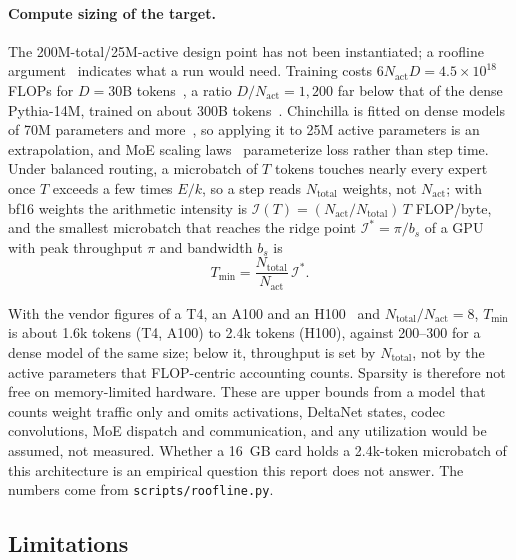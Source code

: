 \documentclass[11pt]{article}
\begin{document}
\paragraph{Compute sizing of the target.}
\label{sec:sizing}
The 200M-total/25M-active design point has not been instantiated; a roofline
argument~\citep{williams2009roofline} indicates what a run would need. Training costs
$6N_{\text{act}}D=4.5\times10^{18}$ FLOPs for $D=30$B tokens~\citep{kaplan2020scaling}, a ratio
$D/N_{\text{act}}=1{,}200$ far below that of the dense Pythia-14M, trained on about 300B
tokens~\citep{biderman2023pythia}. Chinchilla is fitted on dense models of 70M parameters and
more~\citep{hoffmann2022chinchilla}, so applying it to 25M active parameters is an extrapolation,
and MoE scaling laws~\citep{ludziejewski2025moe,abnar2025parameters} parameterize loss rather
than step time. Under balanced routing, a microbatch of $T$ tokens touches nearly every expert
once $T$ exceeds a few times $E/k$, so a step reads $N_{\text{total}}$ weights, not
$N_{\text{act}}$; with bf16 weights the arithmetic intensity is
$\mathcal{I}(T)=(N_{\text{act}}/N_{\text{total}})\,T$ FLOP/byte, and the smallest microbatch that
reaches the ridge point $\mathcal{I}^{\ast}=\pi/b_s$ of a GPU with peak throughput $\pi$ and
bandwidth $b_s$ is
\begin{equation}
T_{\min}=\frac{N_{\text{total}}}{N_{\text{act}}}\,\mathcal{I}^{\ast}.
\label{eq:tmin}
\end{equation}

With the vendor figures of a T4, an A100 and an H100~\citep{nvidia2018t4,nvidia2020a100,nvidia2022h100}
and $N_{\text{total}}/N_{\text{act}}=8$, $T_{\min}$ is about 1.6k tokens (T4, A100) to 2.4k tokens
(H100), against 200--300 for a dense model of the same size; below it, throughput is set by
$N_{\text{total}}$, not by the active parameters that FLOP-centric accounting counts. Sparsity is
therefore not free on memory-limited hardware. These are upper bounds from a model that counts
weight traffic only and omits activations, DeltaNet states, codec convolutions, MoE dispatch and
communication, and any utilization would be assumed, not measured. Whether a 16~GB card holds a
2.4k-token microbatch of this architecture is an empirical question this report does not answer.
The numbers come from \texttt{scripts/roofline.py}.

\subsection{Limitations}
\end{document}
